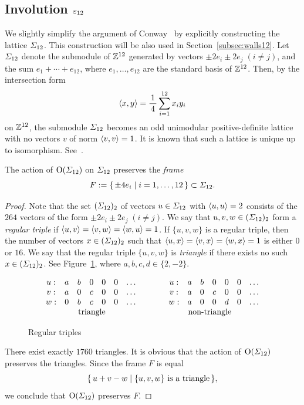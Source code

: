 \documentclass{amsart} %
\begin{document}
\subsection{Involution $\varepsilon_{12}$}\label{subsec:vep12}
%
We slightly simplify the argument of Conway~\cite[Chapter~10, Section~3.7]{theCSbook} 
by explicitly constructing the lattice $\varSigma_{12}$.
This construction will be also used in Section~\ref{subsec:walls12}.
Let $\varSigma_{12}$ denote the submodule of $\mathord{\mathbb{Z}}^{12}$ generated by vectors 
$\pm 2 e_i\pm 2 e_j\; (i\ne j)$, 
and the sum $e_1+\cdots+e_{12}$,
where $e_1,\dots, e_{12}$ are the standard basis of $\mathord{\mathbb{Z}}^{12}$.
Then, by the intersection form 
\[
\langle x, y \rangle=\frac{1}{\,4\,} \sum_{i=1}^{12} x_i y_i
\]
on $\mathord{\mathbb{Z}}^{12}$, the submodule $\varSigma_{12}$ becomes an odd unimodular
positive-definite lattice with no vectors $v$ of norm  $\langle v, v \rangle=1$.
It is known that such a lattice is unique up to isomorphism. 
See~\cite[Table 16.7]{theCSbook}.
%
\begin{lemma}\label{lem:frame}
The action of $\mathord{\mathrm{O}}(\varSigma_{12})$ on $\varSigma_{12}$ preserves
the \emph{frame}
\[
F:=\{\,{\pm 4 e_i}\mid {i=1, \dots, 12} \,\}\subset \varSigma_{12}.
\]
\end{lemma}
%
\begin{proof}
Note that the set $(\varSigma_{12})_2$ of vectors $u\in \varSigma_{12}$ with $\langle u, u \rangle=2$
consists of the $264$ vectors of the form $\pm 2 e_i\pm 2 e_j\; (i\ne j)$.
We say that $u, v, w\in( \varSigma_{12})_2$ form a \emph{regular triple} if 
$\langle u, v \rangle=\langle v, w \rangle=\langle w, u \rangle=1$.
If $\{u, v, w\}$ is a regular triple, then the number of 
vectors $x\in( \varSigma_{12})_2$ such that 
$\langle u, x \rangle=\langle v, x \rangle=\langle w, x \rangle=1$
is either $0$ or $16$.
We say that the regular triple $\{u, v, w\}$ is \emph{triangle} if there exists no such $x\in (\varSigma_{12})_2$.
See Figure~\ref{fig:triangle},
where $a, b, c , d\in \{2, -2\}$.
%
\begin{figure}
{\small
\[
\begin{array}{ccccccc}
u: & a& b & 0 & 0 & 0 &\dots\\
v: &a&0 & c & 0 & 0 &\dots\\
w: & 0& b & c & 0 & 0 & \dots\\
& \rlap{\textrm{\;\;\;\;\;triangle}} && &
\end{array}
\qquad\quad
\begin{array}{ccccccc}
u: &a& b & 0 & 0 & 0 &\dots\\
v: &a&0 & c & 0 & 0 & \dots\\
w: &a& 0 & 0 & d & 0 & \dots\\
\rlap{ \textrm{\;\;\;\;\;non-triangle}} && & &
\end{array}
\]
}
\vskip -1mm
\caption{Regular triples}\label{fig:triangle}
\end{figure}
%
There exist exactly $1760$ triangles.
It is obvious that the action of $\mathord{\mathrm{O}}(\varSigma_{12})$ preserves the triangles.
Since 
 the frame $F$ is equal 
\[
\{\,{u+v-w}\mid {\textrm{$\{u, v, w\}$ is a triangle}} \,\},
\]
we conclude that $\mathord{\mathrm{O}}(\varSigma_{12})$ preserves $F$.
\end{proof}
\end{document}
